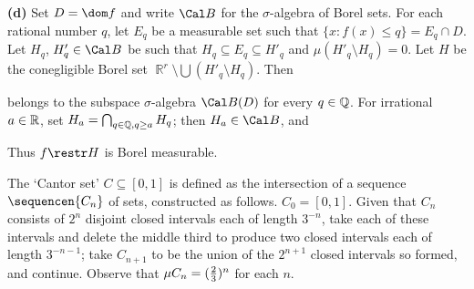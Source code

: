 {\medskip
     
{\bf (d)} Set $D=\dom f$ and write $\Cal B$ for the $\sigma$-algebra of
Borel sets.   For each rational number $q$, let $E_q$ be a measurable
set such that $\{x:f(x)\le q\}=E_q\cap D$.   Let $H_q$, $H_q'\in\Cal B$
be such that $H_q\subseteq E_q\subseteq H'_q$ and
$\mu(H'_q\setminus H_q)=0$.   Let $H$ be the conegligible Borel set
$\BbbR^r\setminus\bigcup(H'_q\setminus H_q)$.   Then
     
     
\noindent belongs to the subspace $\sigma$-algebra $\Cal B(D)$ for every
$q\in\Bbb Q$.   For irrational $a\in\Bbb R$, set
$H_a=\bigcap_{q\in\Bbb Q,q\ge a}H_q$;  then $H_a\in\Cal B$, and
     
     
\noindent Thus $f\restr H$ is Borel measurable.
}%
     
     
     
 The `Cantor set'
$C\subseteq[0,1]$ is defined as the intersection  of a sequence
$\sequencen{C_n}$ of
sets, constructed as follows.   $C_0=[0,1]$.   Given that $C_n$ consists
of $2^n$ disjoint closed intervals each of length $3^{-n}$, take each of
these intervals and delete the middle third to produce two closed
intervals each of length $3^{-n-1}$;  take $C_{n+1}$ to be the union of
the $2^{n+1}$ closed intervals so formed, and continue.   Observe that
$\mu C_n=({2\over 3})^n$ for each $n$.

